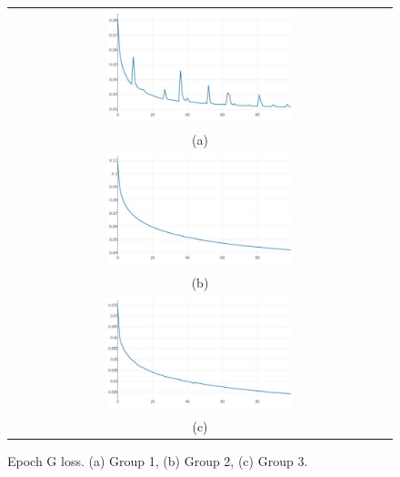 \documentclass[10pt,twocolumn,letterpaper]{article}
\begin{document}
\begin{figure}%
\centering\begin{tabular}{c}
\includegraphics[width=0.5\textwidth]{fig16-a}\\
(a)\\[3ex]%
\includegraphics[width=0.5\textwidth]{fig16-b}\\
(b)\\[3ex]
\includegraphics[width=0.5\textwidth]{fig16-c}\\
(c)
\end{tabular}
\caption{Epoch G loss. (a) Group 1, (b) Group 2, (c) Group 3.}%
\label{fig16}%
\end{figure}
\end{document}
